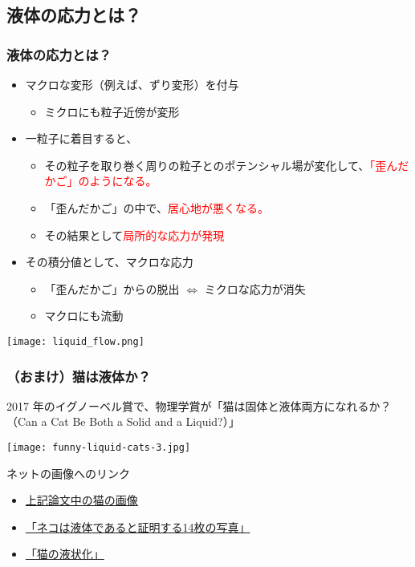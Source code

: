 \documentclass[12pt, dvipdfmx]{beamer}
\begin{document}
\subsection{液体の応力とは？}
\begin{frame}
	\frametitle{液体の応力とは？}
		\begin{itemize}
			\item マクロな変形（例えば、ずり変形）を付与
			\begin{itemize}
				\item ミクロにも粒子近傍が変形
			\end{itemize}
			\item 一粒子に着目すると、
			\begin{itemize}
				\item その粒子を取り巻く周りの粒子とのポテンシャル場が変化して、\textcolor{red}{「歪んだかご」のようになる。}
				\item 「歪んだかご」の中で、\textcolor{red}{居心地が悪くなる。}
				\item その結果として\textcolor{red}{局所的な応力が発現}
			\end{itemize}
			\item その積分値として、マクロな応力
			\begin{itemize}
				\item 「歪んだかご」からの\alert{脱出 $\Leftrightarrow$ ミクロな応力が消失 }
				\item マクロにも\alert{流動}
			\end{itemize}
		\end{itemize}
		\vspace{3mm}
		\begin{center}
			\texttt{[image: liquid\_flow.png]}
		\end{center}
\end{frame}

\begin{frame}
	\frametitle{（おまけ）猫は液体か？}
	2017 年のイグノーベル賞で、物理学賞が「猫は固体と液体両方になれるか？（Can a Cat Be Both a Solid and a Liquid?）」
		\begin{center}
			\texttt{[image: funny-liquid-cats-3.jpg]}
		\end{center}

		ネットの画像へのリンク
		\begin{itemize}
			\item \href{https://drive.google.com/file/d/1IaglSdZWwZc_X989BEf_p33t0Ci8XHUe/view?usp=sharing}{上記論文中の猫の画像}
			\item \href{https://www.buzzfeed.com/jp/pablovaldivia/liquid-cats-1}{「ネコは液体であると証明する14枚の写真」}
			\item \href{http://karapaia.com/archives/52205481.html}{「猫の液状化」}
		\end{itemize}
\end{frame}
\end{document}
